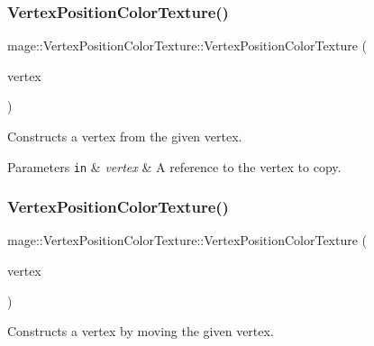 \subsubsection{\texorpdfstring{Vertex\+Position\+Color\+Texture()}{VertexPositionColorTexture()}\hspace{0.1cm}{\footnotesize\ttfamily [3/4]}}
{\footnotesize\ttfamily mage\+::\+Vertex\+Position\+Color\+Texture\+::\+Vertex\+Position\+Color\+Texture (\begin{DoxyParamCaption}\item[{const \hyperlink{structmage_1_1_vertex_position_color_texture}{Vertex\+Position\+Color\+Texture} \&}]{vertex }\end{DoxyParamCaption})\hspace{0.3cm}{\ttfamily [default]}}

Constructs a vertex from the given vertex.


\begin{DoxyParams}[1]{Parameters}
\mbox{\tt in}  & {\em vertex} & A reference to the vertex to copy. \\
\hline
\end{DoxyParams}
\hypertarget{structmage_1_1_vertex_position_color_texture_ad3dcf3020023261216437b6315f29261}{}\label{structmage_1_1_vertex_position_color_texture_ad3dcf3020023261216437b6315f29261} 
\subsubsection{\texorpdfstring{Vertex\+Position\+Color\+Texture()}{VertexPositionColorTexture()}\hspace{0.1cm}{\footnotesize\ttfamily [4/4]}}
{\footnotesize\ttfamily mage\+::\+Vertex\+Position\+Color\+Texture\+::\+Vertex\+Position\+Color\+Texture (\begin{DoxyParamCaption}\item[{\hyperlink{structmage_1_1_vertex_position_color_texture}{Vertex\+Position\+Color\+Texture} \&\&}]{vertex }\end{DoxyParamCaption})\hspace{0.3cm}{\ttfamily [default]}}

Constructs a vertex by moving the given vertex.


